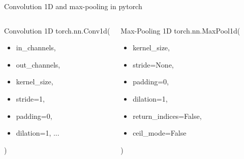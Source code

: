   \begin{frame}{Convolution 1D and max-pooling in pytorch}
    \begin{columns}
      \begin{block}{Convolution 1D}
        torch.nn.Conv1d(
        \begin{itemize}
        \item in\_channels, 
        \item out\_channels, 
        \item kernel\_size, 
        \item stride=1, 
        \item padding=0,
        \item dilation=1, ...
        \end{itemize}
        )
      \end{block}
      \begin{block}{Max-Pooling 1D}
      torch.nn.MaxPool1d(
      \begin{itemize}
      \item kernel\_size, 
      \item stride=None, 
      \item padding=0, 
      \item dilation=1,
      \item return\_indices=False, 
      \item ceil\_mode=False
      \end{itemize}
      )
    \end{block}
    \end{columns}
  \end{frame}




